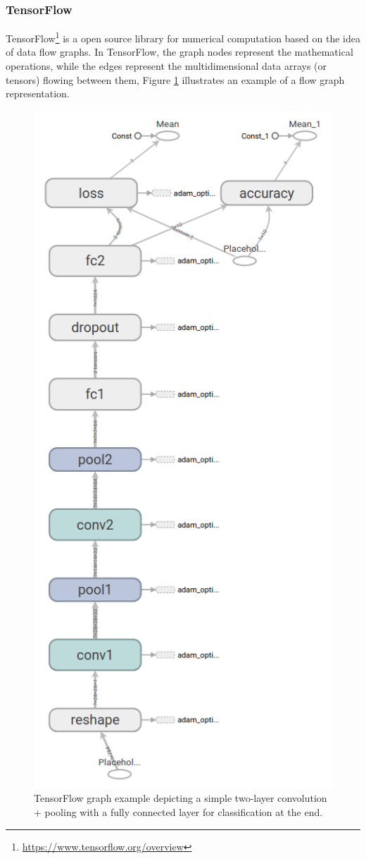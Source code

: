 \subsubsection{TensorFlow}
TensorFlow\footnote{\url{https://www.tensorflow.org/overview}} is a open source library for numerical computation based on the idea of data flow graphs. In TensorFlow, the graph nodes represent the mathematical operations, while the edges represent the multidimensional data arrays (or tensors) flowing between them, Figure \ref{fig:tensorflow} illustrates an example of a flow graph representation.

\begin{figure}[h]
	\includegraphics[scale=0.3]{archivos/tensorflow.png}
	\centering
	\caption{TensorFlow graph example depicting a simple two-layer convolution + pooling with a fully connected layer for classification at the end.}
	\label{fig:tensorflow}
\end{figure}

